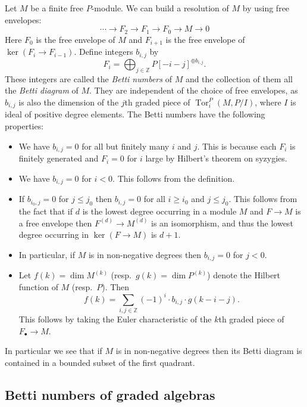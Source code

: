 \documentclass{amsart}
\theoremstyle{definition}
\theoremstyle{remark}
\DeclareMathOperator{\Tor}{Tor}
\def\Z{\mathbb{Z}}
\begin{document}
Let $M$ be a finite free $P$-module.  We can build a resolution of $M$ by using
free envelopes:
\begin{displaymath}
\cdots \to F_2 \to F_1 \to F_0 \to M \to 0
\end{displaymath}
Here $F_0$ is the free envelope of $M$ and $F_{i+1}$ is the free envelope of
$\ker(F_i \to F_{i-1})$.  Define integers $b_{i, j}$ by
\begin{displaymath}
F_i=\bigoplus_{j \in \Z} P[-i-j]^{\oplus b_{i, j}}.
\end{displaymath}
These integers are called the \emph{Betti numbers} of $M$ and the collection of
them all the \emph{Betti diagram} of $M$.  They are independent of the choice of
free envelopes, as $b_{i, j}$ is also the dimension of the $j$th graded piece of
$\Tor_i^P(M, P/I)$, where $I$ is ideal of positive degree elements.  The Betti
numbers have the following properties:
\begin{itemize}
\item[(B1)] We have $b_{i, j}=0$ for all but finitely many $i$ and $j$.  This is
because each $F_i$ is finitely generated and $F_i=0$ for $i$ large by Hilbert's
theorem on syzygies.
\item[(B2)] We have $b_{i, j}=0$ for $i<0$.  This follows from the definition.
\item[(B3)] If $b_{i_0, j}=0$ for $j \le j_0$ then $b_{i, j}=0$ for all $i
\ge i_0$ and $j \le j_0$.  This follows from the fact that if $d$ is the lowest
degree occurring in a module $M$ and $F \to M$ is a free envelope then $F^{(d)}
\to M^{(d)}$ is an isomorphism, and thus the lowest degree occurring in
$\ker(F \to M)$ is $d+1$.
\item[(B4)] In particular, if $M$ is in non-negative degrees then $b_{i, j}=0$
for $j<0$.
\item[(B5)] Let $f(k)=\dim{M^{(k)}}$ (resp.\ $g(k)=\dim{P^{(k)}}$) denote the
Hilbert function of $M$ (resp.\ $P$). Then
\begin{displaymath}
f(k)=\sum_{i, j \in \Z} (-1)^i \cdot b_{i, j} \cdot g(k-i-j).
\end{displaymath}
This follows by taking the Euler characteristic of the $k$th graded piece of
$F_{\bullet} \to M$.
\end{itemize}
In particular we see that if $M$ is in non-negative degrees then its Betti
diagram is contained in a bounded subset of the first quadrant.


\subsection{Betti numbers of graded algebras}
\end{document}
